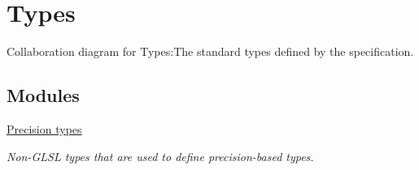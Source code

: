 \hypertarget{group__core__types}{
\section{Types}
\label{group__core__types}
}


Collaboration diagram for Types:The standard types defined by the specification.  
\subsection*{Modules}
\begin{CompactItemize}
\item 
\hyperlink{group__core__precision}{Precision types}
\begin{CompactList}\small\item\em Non-GLSL types that are used to define precision-based types. \item\end{CompactList}

\end{CompactItemize}
